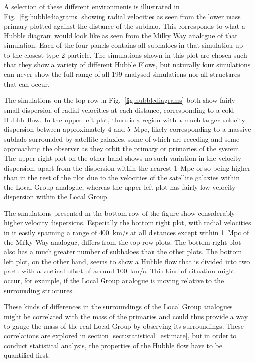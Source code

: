 \documentclass[english, oneside]{HYgradu}
\begin{document}
A selection of these different environments is illustrated in Fig.~\ref{fig:hubblediagrams} showing radial velocities as seen from the lower mass primary plotted against the distance of the subhalo. This corresponds to what a Hubble diagram would look like as seen from the Milky Way analogue of that simulation. Each of the four panels contains all subhaloes in that simulation up to the closest type 2 particle. The simulations shown in this plot are chosen such that they show a variety of different Hubble Flows, but naturally four simulations can never show the full range of all 199 analysed simulations nor all structures that can occur.

The simulations on the top row in Fig.~\ref{fig:hubblediagrams} both show fairly small dispersion of radial velocities at each distance, corresponding to a cold Hubble flow. In the upper left plot, there is a region with a much larger velocity dispersion between approximately 4 and 5~Mpc, likely corresponding to a massive subhalo surrounded by satellite galaxies, some of which are receding and some approaching the observer as they orbit the primary or primaries of the system. The upper right plot on the other hand shows no such variation in the velocity dispersion, apart from the dispersion within the nearest 1~Mpc or so being higher than in the rest of the plot due to the velocities of the satellite galaxies within the Local Group analogue, whereas the upper left plot has fairly low velocity dispersion within the Local Group.

The simulations presented in the bottom row of the figure show considerably higher velocity dispersions. Especially the bottom right plot, with radial velocities in it easily spanning a range of 400~km/s at all distances except within 1~Mpc of the Milky Way analogue, differs from the top row plots. The bottom right plot also has a much greater number of subhaloes than the other plots. The bottom left plot, on the other hand, seems to show a Hubble flow that is divided into two parts with a vertical offset of around 100~km/s. This kind of situation might occur, for example, if the Local Group analogue is moving relative to the surrounding structures.

These kinds of differences in the surroundings of the Local Group analogues might be correlated with the mass of the primaries and could thus provide a way to gauge the mass of the real Local Group by observing its surroundings. These correlations are explored in section \ref{sect:statistical_estimate}, but in order to conduct statistical analysis, the properties of the Hubble flow have to be quantified first.
\end{document}
